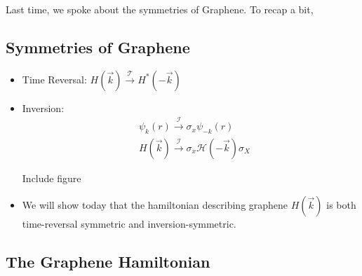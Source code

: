 \documentclass[11pt]{article}
\begin{document}
Last time, we spoke about the symmetries of Graphene. To recap a bit,

\subsection{Symmetries of Graphene}

\begin{itemize}
  \item Time Reversal: $ H(\vec{k}) \xrightarrow{\mathcal{T}} H^*(-\vec{k}) $
  \item Inversion: 
  \begin{align*}
    &\psi_k(r) \xrightarrow{\mathcal{I}} \sigma_x \psi_{-k}(r) \\
    &H(\vec{k}) \xrightarrow{\mathcal{I}} \sigma_x \mathcal{H}(-\vec{k}) \sigma_X
  \end{align*}
  \begin{center}
    Include figure
  \end{center}

  \item We will show today that the hamiltonian describing graphene $H(\vec{k})$ is both time-reversal symmetric and inversion-symmetric.
\end{itemize}

\vskip 1cm
\subsection{The Graphene Hamiltonian}
\end{document}
